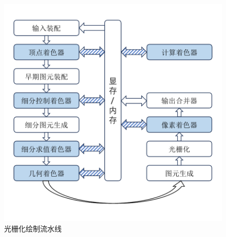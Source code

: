 \begin{figure}
    \centering
    \includegraphics[page=1, width=\linewidth]{figures/pictures.pdf}
    \caption{光栅化绘制流水线}
    \label{fig:rasterize_pipeline}
\end{figure}



